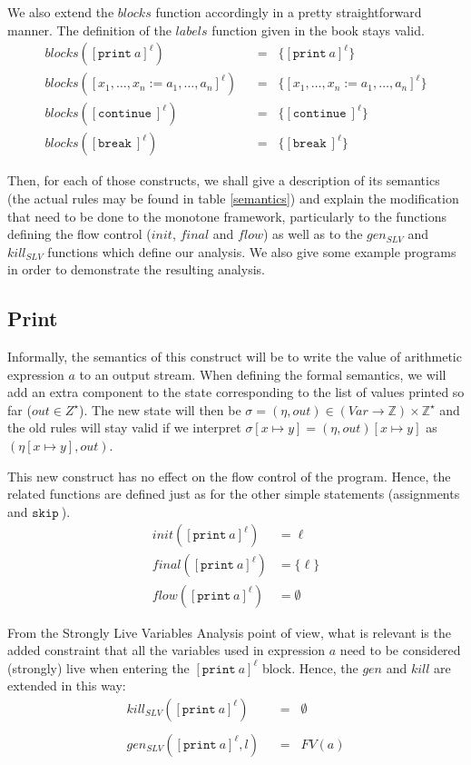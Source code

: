 \documentclass[a4wide,12pt]{article}
\def\eq{\;\; = \;\;}
\def\Z{\mathbb{Z}}
\def\skip {\texttt{skip}\ }
\def\print{\texttt{print}\ }
\def\cont {\texttt{continue}\ }
\def\breakc{\texttt{break}\ }
\begin{document}
We also extend the $blocks$ function accordingly in a pretty straightforward manner. The definition
of the $labels$ function given in the book stays valid.
\begin{align*}
 blocks([\print a]^\ell) & \eq \{[\print a]^\ell\} \\
 blocks([x_1,\ldots,x_n := a_1,\ldots,a_n]^\ell) & \eq \{[x_1,\ldots,x_n := a_1,\ldots,a_n]^\ell\} \\
 blocks([\cont]^\ell) & \eq \{[\cont]^\ell\} \\
 blocks([\breakc]^\ell) & \eq \{[\breakc]^\ell\}
\end{align*}
 
 
Then, for each of those constructs, we shall give a description of its semantics (the actual rules may be found
in table \ref{semantics}) and explain the modification that need to be done
to the monotone framework, particularly to the functions defining the flow control
($init$, $final$ and $flow$) as well as to the $gen_{SLV}$ and $kill_{SLV}$ functions
which define our analysis. We also give some example
programs in order to demonstrate the resulting analysis.
 
\subsection{Print}
 
Informally, the semantics of this construct will be to write the value of arithmetic expression $a$
to an output stream.
When defining the formal
semantics, we will add an extra component to the state corresponding to the
list of values printed so far ($out \in Z^\star$). The new state will then be
$\sigma = (\eta,out) \in (Var \to \Z) \times \Z^\star$ and the old rules will stay valid
if we interpret $\sigma[x \mapsto y] = (\eta,out)[x \mapsto y]$ as $(\eta[x \mapsto y],out)$.
 

This new construct has no effect on the flow control of the program. Hence, the related functions are
defined just as for the other simple statements (assignments and $\skip$).
\begin{align*}
init([\print a]^\ell) & = \ell \\
final([\print a]^\ell) & = \{\ell\} \\
flow([\print a]^\ell) & = \emptyset
\end{align*}
 
From the Strongly Live Variables Analysis point of view, what is relevant is
the added constraint that all the variables used in expression $a$ need to be
considered (strongly) live when entering the $[\print a]^\ell$ block. Hence, the $gen$ and $kill$ are extended in this way:
\begin{align*}
kill_{SLV}([\print a]^\ell) & \eq \emptyset \\
\\
gen_{SLV}([\print a]^\ell,l) & \eq FV(a)
\end{align*}
 
\end{document}
